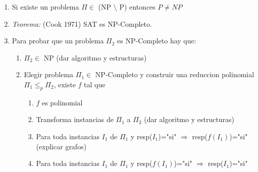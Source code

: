 \begin{enumerate}
\item Si existe un problema $\Pi \in$ (NP $\setminus$ P) entonces $P\neq NP$
\item \textit{Teorema:} (Cook 1971) SAT es NP-Completo.
\item Para probar que un problema $\Pi_{2}$ es NP-Completo hay que:
   \begin{enumerate}
   \item $\Pi_{2} \in$ NP (dar algoritmo y estructuras)
   \item Elegir problema $\Pi_{1} \in$ NP-Completo y construir una reduccion polinomial $\Pi_{1} \leq_{p} \Pi_{2}$, existe $f$ tal que
      \begin{enumerate}
      \item $f$ es polinomial
      \item Transforma instancias de $\Pi_{1}$ a $\Pi_{2}$ (dar algoritmo y estructuras)
      \item Para toda instancias $I_{1}$ de $\Pi_{1}$ y resp($I_{1}$)="si" $\Rightarrow$ resp($f(I_{1})$)="si" (explicar grafos)
      \item Para toda instancias $I_{1}$ de $\Pi_{1}$ y resp($f(I_{1})$)="si" $\Rightarrow$ resp($I_{1}$)="si"
      \end{enumerate}
   \end{enumerate}
\end{enumerate}
